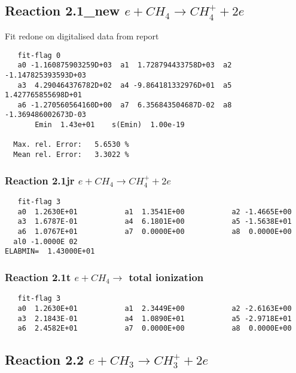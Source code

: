 \documentclass[12pt]{article}
\begin{document}
\subsection{
Reaction 2.1\mbox{\_new} $e + CH_4 \rightarrow CH_4^+ + 2e$
}
Fit redone on digitalised data from report
\begin{small}\begin{verbatim}
   fit-flag 0
   a0 -1.160875903259D+03  a1  1.728794433758D+03  a2 -1.147825393593D+03
   a3  4.290464376782D+02  a4 -9.864181332976D+01  a5  1.427765855698D+01
   a6 -1.270560564160D+00  a7  6.356843504687D-02  a8 -1.369486002673D-03
       Emin  1.43e+01    s(Emin)  1.00e-19   

  Max. rel. Error:   5.6530 %
  Mean rel. Error:   3.3022 %
\end{verbatim}\end{small}

 
\subsubsection{
Reaction 2.1jr  $e + CH_4 \rightarrow CH_4^+ + 2e $
}
 
\begin{small}\begin{verbatim} 
   fit-flag 3
   a0  1.2630E+01           a1  1.3541E+00           a2 -1.4665E+00 
   a3  1.6787E-01           a4  6.1801E+00           a5 -1.5638E+01 
   a6  1.0767E+01           a7  0.0000E+00           a8  0.0000E+00
  al0 -1.0000E 02
ELABMIN=  1.43000E+01
\end{verbatim}\end{small}

 
\subsubsection{
Reaction 2.1t  $e + CH_{4} \rightarrow$ total ionization 
}
 
\begin{small}\begin{verbatim} 
   fit-flag 3
   a0  1.2630E+01           a1  2.3449E+00           a2 -2.6163E+00 
   a3  2.1843E-01           a4  1.0890E+01           a5 -2.9718E+01 
   a6  2.4582E+01           a7  0.0000E+00           a8  0.0000E+00
\end{verbatim}\end{small}

\subsection{
Reaction 2.2  $e + CH_3 \rightarrow CH_3^+ + 2e$
}
\end{document}
